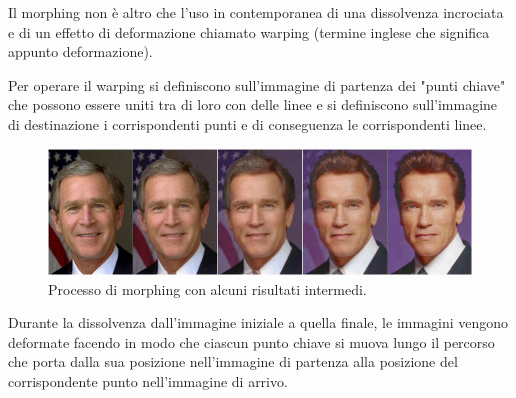 \vspace{1em} \noindent
Il morphing non è altro che l'uso in contemporanea di una dissolvenza incrociata e di un effetto di deformazione chiamato warping (termine inglese che significa appunto deformazione).

\vspace{1em} \noindent
Per operare il warping si definiscono sull'immagine di partenza dei "punti chiave" che possono essere uniti tra di loro con delle linee e si definiscono sull'immagine di destinazione i corrispondenti punti e di conseguenza le corrispondenti linee.\\ 
\begin{figure}[htb] \centering
\includegraphics[scale=0.5, trim = 0 1.1cm 0 0, clip]{Pictures/Striscia_morphing.jpg}
\caption{Processo di morphing con alcuni risultati intermedi.}\label{fig:figura}
\end{figure}

\noindent
Durante la dissolvenza dall'immagine iniziale a quella finale, le immagini vengono deformate facendo in modo che ciascun punto chiave si muova lungo il percorso che porta dalla sua posizione nell'immagine di partenza alla posizione del corrispondente punto nell'immagine di arrivo.\\